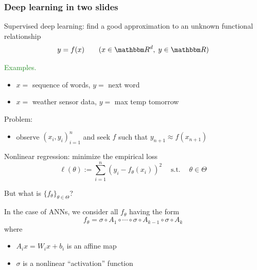 \documentclass[
    xcolor={svgnames,dvipsnames},
    hyperref={colorlinks, citecolor=DeepPink4, linkcolor=DarkRed, urlcolor=DarkBlue}
    ]{beamer}  %
\newcommand{\Egs}{\textcolor{ForestGreen}{Examples. }}
\newcommand{\st}{\ensuremath{\ \mathrm{s.t.}\ }}
\newcommand{\1}{\mathbbm 1}
\newcommand{\RR}{\mathbbm R}
\begin{document}
\begin{frame}
    \frametitle{Deep learning in two slides}
    
    Supervised deep learning: find a good approximation to an unknown functional
    relationship
    \begin{equation*}
        y = f(x)
        \qquad (x \in \RR^d, \; y \in \RR)
    \end{equation*}

    \Egs
    \begin{itemize}
        \item $x = $ sequence of words, $y = $ next word
        \vspace{0.5em}
        \item $x = $ weather sensor data, $y = $ max temp tomorrow
    \end{itemize}
        \vspace{0.5em}
        \vspace{0.5em}

    Problem:

    \begin{itemize}
        \item observe $(x_i, y_i)_{i=1}^n$ and seek $f$ such that $y_{n+1}
            \approx f(x_{n+1})$
    \end{itemize}


\end{frame}


\begin{frame}

    Nonlinear regression: minimize the empirical loss
    \begin{equation*}
        \ell(\theta) := \sum_{i=1}^n (y_i - f_\theta(x_i))^2
        \quad \st \quad \theta \in \Theta
    \end{equation*}


    \pause
    But what is $\{f_\theta\}_{\theta \in \Theta}$?

    \pause
    \vspace{0.5em}
    In the case of ANNs, we consider all $f_\theta$ having the form
    \begin{equation*}
        f_\theta
        = \sigma \circ A_{1} 
            \circ \cdots \circ \sigma \circ A_{k-1}  \circ \sigma \circ A_{k}
    \end{equation*}
    where
    \begin{itemize}
        \item $A_{i} x = W_i x + b_i $ is an affine map 
        \vspace{0.5em}
        \item $\sigma$ is a nonlinear ``activation'' function
    \end{itemize}

\end{frame}
\end{document}
